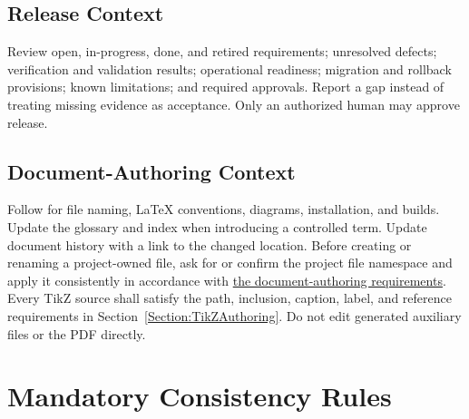 \subsection{Release Context}
Review open, in-progress, done, and retired requirements; unresolved defects;
verification and validation results; operational readiness; migration and
rollback provisions; known limitations; and required approvals. Report a gap
instead of treating missing evidence as acceptance. Only an authorized human
may approve release.

\subsection{Document-Authoring Context}
Follow  for file naming, LaTeX conventions, diagrams,
installation, and builds. Update the glossary and index when introducing a
controlled term. Update document history with a link to the changed location.
Before creating or renaming a project-owned file, ask for or confirm the
project file namespace and apply it consistently in accordance with
\hyperref[Table:DocumentAuthoringRequirements]{the document-authoring
requirements}.
Every TikZ source shall satisfy the path, inclusion, caption, label, and
reference requirements in Section~\ref{Section:TikZAuthoring}. Do not edit
generated auxiliary files or the PDF directly.

\section{Mandatory Consistency Rules}

